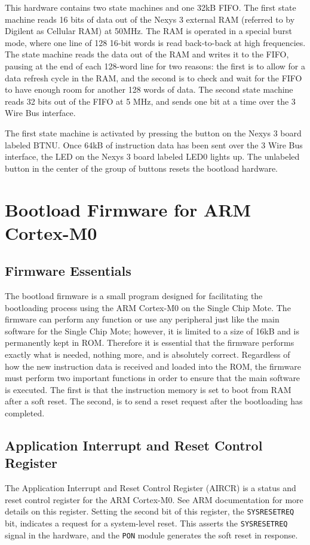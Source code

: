 This hardware contains two state machines and one 32kB FIFO. The first state machine reads 16 bits of data out of the Nexys 3 external RAM (referred to by Digilent as Cellular RAM) at 50MHz. The RAM is operated in a special burst mode, where one line of 128 16-bit words is read back-to-back at high frequencies. The state machine reads the data out of the RAM and writes it to the FIFO, pausing at the end of each 128-word line for two reasons: the first is to allow for a data refresh cycle in the RAM, and the second is to check and wait for the FIFO to have enough room for another 128 words of data. The second state machine reads 32 bits out of the FIFO at 5 MHz, and sends one bit at a time over the 3 Wire Bus interface.

The first state machine is activated by pressing the button on the Nexys 3 board labeled BTNU. Once 64kB of instruction data has been sent over the 3 Wire Bus interface, the LED on the Nexys 3 board labeled LED0 lights up. The unlabeled button in the center of the group of buttons resets the bootload hardware.

\section{Bootload Firmware for ARM Cortex-M0}
\subsection{Firmware Essentials}
The bootload firmware is a small program designed for facilitating the bootloading process using the ARM Cortex-M0 on the Single Chip Mote. The firmware can perform any function or use any peripheral just like the main software for the Single Chip Mote; however, it is limited to a size of 16kB and is permanently kept in ROM. Therefore it is essential that the firmware performs exactly what is needed, nothing more, and is absolutely correct. Regardless of how the new instruction data is received and loaded into the ROM, the firmware must perform two important functions in order to ensure that the main software is executed. The first is that the instruction memory is set to boot from RAM after a soft reset. The second, is to send a reset request after the bootloading has completed.

\subsection{Application Interrupt and Reset Control Register}
The Application Interrupt and Reset Control Register (AIRCR) is a status and reset control register for the ARM Cortex-M0. See ARM documentation for more details on this register. Setting the second bit of this register, the \texttt{SYSRESETREQ} bit, indicates a request for a system-level reset. This asserts the \texttt{SYSRESETREQ} signal in the hardware, and the \texttt{PON} module generates the soft reset in response.

